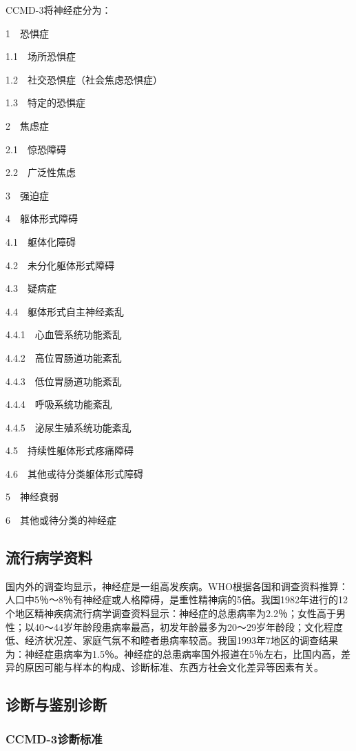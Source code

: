 CCMD-3将神经症分为：

1　恐惧症

1.1　场所恐惧症

1.2　社交恐惧症（社会焦虑恐惧症）

1.3　特定的恐惧症

2　焦虑症

2.1　惊恐障碍

2.2　广泛性焦虑

3　强迫症

4　躯体形式障碍

4.1　躯体化障碍

4.2　未分化躯体形式障碍

4.3　疑病症

4.4　躯体形式自主神经紊乱

4.4.1　心血管系统功能紊乱

4.4.2　高位胃肠道功能紊乱

4.4.3　低位胃肠道功能紊乱

4.4.4　呼吸系统功能紊乱

4.4.5　泌尿生殖系统功能紊乱

4.5　持续性躯体形式疼痛障碍

4.6　其他或待分类躯体形式障碍

5　神经衰弱

6　其他或待分类的神经症

\subsection{流行病学资料}

国内外的调查均显示，神经症是一组高发疾病。WHO根据各国和调查资料推算：人口中5％～8％有神经症或人格障碍，是重性精神病的5倍。我国1982年进行的12个地区精神疾病流行病学调查资料显示：神经症的总患病率为2.2％；女性高于男性；以40～44岁年龄段患病率最高，初发年龄最多为20～29岁年龄段；文化程度低、经济状况差、家庭气氛不和睦者患病率较高。我国1993年7地区的调查结果为：神经症患病率为1.5％。神经症的总患病率国外报道在5％左右，比国内高，差异的原因可能与样本的构成、诊断标准、东西方社会文化差异等因素有关。

\subsection{诊断与鉴别诊断}

\subsubsection{CCMD-3诊断标准}

